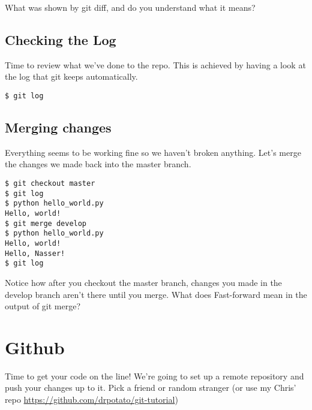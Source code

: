 \documentclass{tufte-handout}
\begin{document}
\noindent What was shown by git diff, and do you understand what it means?

\subsection{Checking the Log}

\noindent Time to review what we've done to the repo. This is achieved by having a look
at the log that git keeps automatically.

\begin{lstlisting}
$ git log
\end{lstlisting}

\subsection{Merging changes}
\noindent Everything seems to be working fine so we haven't broken anything. 
Let's merge the changes we made back into the master branch.

\begin{lstlisting}
$ git checkout master
$ git log
$ python hello_world.py
Hello, world!
$ git merge develop
$ python hello_world.py
Hello, world!
Hello, Nasser!
$ git log
\end{lstlisting}

\noindent Notice how after you checkout the master branch, changes you made in
the develop branch aren't there until you merge. What does Fast-forward mean in
the output of git merge?

\section{Github}

Time to get your code on the line! We're going to set up a remote repository
and push your changes up to it. Pick a friend or random stranger (or use my
Chris' repo \url{https://github.com/drpotato/git-tutorial})
\end{document}
